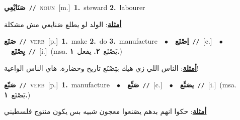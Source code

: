 \documentclass[10pt,a4paper,twoside]{article} %
\begin{document}
\begin{multicols}{2}
{\setlength\topsep{0pt}\textbf{\foreignlanguage{arabic}{صَنَايْعِي}}\ {\color{gray}\texttt{//}\color{black}}\ \textsc{noun}\ [m.]\ \textbf{1.}~steward  \textbf{2.}~labourer\  \begin{flushright}\color{gray}\foreignlanguage{arabic}{\textbf{\underline{\foreignlanguage{arabic}{أمثلة}}}: الولد لو يطلع صَنايعي مش مشكلة}\end{flushright}\color{black}} \vspace{2mm}

{\setlength\topsep{0pt}\textbf{\foreignlanguage{arabic}{صَنَع}}\ {\color{gray}\texttt{//}\color{black}}\ \textsc{verb}\ [p.]\ \textbf{1.}~make  \textbf{2.}~do  \textbf{3.}~manufacture\ \ $\bullet$\ \ \setlength\topsep{0pt}\textbf{\foreignlanguage{arabic}{اِصْنَع}}\ {\color{gray}\texttt{//}\color{black}}\ [c.]\ \ $\bullet$\ \ \setlength\topsep{0pt}\textbf{\foreignlanguage{arabic}{يِصْنَع}}\ {\color{gray}\texttt{//}\color{black}}\ [i.]\ \color{gray}(msa. \foreignlanguage{arabic}{يَصْنَع}~\foreignlanguage{arabic}{\textbf{٢.}}  \foreignlanguage{arabic}{يفعل}~\foreignlanguage{arabic}{\textbf{١.}})\color{black}\  \begin{flushright}\color{gray}\foreignlanguage{arabic}{\textbf{\underline{\foreignlanguage{arabic}{أمثلة}}}: الناس اللي زي هيك بتِصْنَع تاريخ وحضارة. هاي الناس الواعية!}\end{flushright}\color{black}} \vspace{2mm}

{\setlength\topsep{0pt}\textbf{\foreignlanguage{arabic}{صَنّع}}\ {\color{gray}\texttt{//}\color{black}}\ \textsc{verb}\ [p.]\ \textbf{1.}~manufacture\ \ $\bullet$\ \ \setlength\topsep{0pt}\textbf{\foreignlanguage{arabic}{صَنِّع}}\ {\color{gray}\texttt{//}\color{black}}\ [c.]\ \ $\bullet$\ \ \setlength\topsep{0pt}\textbf{\foreignlanguage{arabic}{يصَنِّع}}\ {\color{gray}\texttt{//}\color{black}}\ [i.]\ \color{gray}(msa. \foreignlanguage{arabic}{يَصْنَع}~\foreignlanguage{arabic}{\textbf{١.}})\color{black}\  \begin{flushright}\color{gray}\foreignlanguage{arabic}{\textbf{\underline{\foreignlanguage{arabic}{أمثلة}}}: حكوا انهم بدهم يصَنعوا معجون شبيه بس يكون منتوج فلسطيني}\end{flushright}\color{black}} \vspace{2mm}


\end{multicols}
\end{document}
